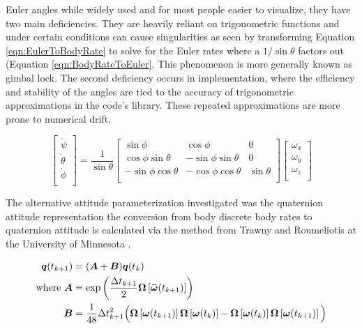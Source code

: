 Euler angles while widely used and for most people easier to visualize, they have two main deficiencies.  They are heavily reliant on trigonometric functions and under certain conditions can cause singularities as seen by transforming Equation \ref{eqn:EulerToBodyRate} to solve for the Euler rates where a $1/\sin \theta$ factors out (Equation \ref{eqn:BodyRateToEuler}.  This phenomenon is more generally known as gimbal lock.  The second deficiency occurs in implementation, where the efficiency and stability of the angles are tied to the accuracy of trigonometric approximations in the code's library.  These repeated approximations are more prone to numerical drift.

\begin{equation}
  \begin{bmatrix}
    \dot{\psi} \\
    \dot{\theta} \\
    \dot{\phi} \\
  \end{bmatrix}
  =
  \frac{1}{\sin \theta}
  \begin{bmatrix}
    \sin \phi & \cos \phi & 0 \\
    \cos \phi \sin \theta & -\sin \phi \sin \theta & 0 \\
    -\sin \phi \cos \theta & -\cos \phi \cos \theta & \sin \theta \\
  \end{bmatrix}
  \begin{bmatrix}
    \omega_x \\
    \omega_y \\
    \omega_z \\
  \end{bmatrix}
  \label{eqn:BodyRateToEuler}
\end{equation}

The alternative attitude parameterization investigated was the quaternion attitude representation the conversion from body discrete body rates to quaternion attitude is calculated via the method from Trawny and Roumeliotis at the University of Minnesota \cite{marslab}.

\begin{equation}
  \begin{aligned}
    \boldsymbol{q}(t_{k+1}) &= ( \boldsymbol{A} + \boldsymbol{B} ) \boldsymbol{q}(t_{k}) \\
    \text{where } \boldsymbol{A} &= \exp \left( \frac{\Delta t_{k+1}}{2} \boldsymbol{\Omega} \left[ \boldsymbol{\bar{\omega}}(t_{k+1}) \right] \right)\\
    \boldsymbol{B} &= \frac{1}{48} \Delta t_{k+1}^2 \Big(
    \boldsymbol{\Omega} \left[\boldsymbol{\omega}(t_{k+1}) \right]
    \boldsymbol{\Omega} \left[\boldsymbol{\omega}(t_{k})   \right] -
    \boldsymbol{\Omega} \left[\boldsymbol{\omega}(t_{k})   \right]
    \boldsymbol{\Omega} \left[\boldsymbol{\omega}(t_{k+1}) \right]
      \Big)
  \end{aligned}
  \label{eqn:DiscreteQuaternionPropagation}
\end{equation}

